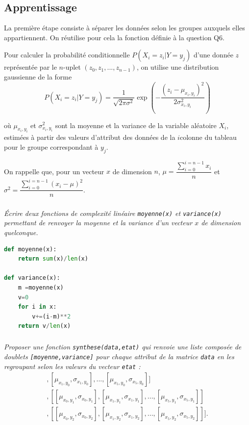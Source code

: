 \subsection*{Apprentissage}

\ifprof
\else
La première étape consiste à séparer les données selon les groupes auxquels elles appartiennent. On
réutilise pour cela la fonction  définie à la question Q6.


Pour calculer la probabilité conditionnelle $P\left(X_i = z_i|Y = y_j\right)$ d’une donnée $z$ représentée par le $n$-uplet $\left(z_0, z_1, ..., z_{n-1}\right)$, on utilise une distribution gaussienne de la forme
$$P\left(X_i = z_i|Y = y_j\right) = \dfrac{1}{\sqrt{2\pi \sigma^2}}\exp\left(-\dfrac{\left( z_i-\mu_{x_i,y_i}\right)^2}{2\sigma^2_{x_i,y_i}} \right)$$

où $\mu_{x_i,y_i}$ et $\sigma^2_{x_i,y_i}$ sont la moyenne et la variance de la variable aléatoire $X_i$, estimées à partir des valeurs
d’attribut des données de la $i$\ieme colonne du tableau  pour le groupe correspondant à $y_j$.

On rappelle que, pour un vecteur $x$ de dimension $n$, $\mu=\dfrac{\sum\limits_{i=0}^{i=n-1}x_i}{n}$ et $\sigma^2=\dfrac{\sum\limits_{i=0}^{i=n-1}\left(x_i-\mu\right)^2}{n}$.

\fi

\subparagraph{}\textit{Écrire deux fonctions de complexité linéaire \texttt{moyenne(x)} et \texttt{variance(x)} permettant de renvoyer la moyenne et la variance d’un vecteur $x$ de dimension quelconque.}
\ifprof
\begin{corrige}
\begin{lstlisting}[language=Python]
def moyenne(x):
    return sum(x)/len(x)

def variance(x):
    m =moyenne(x)
    v=0
    for i in x:
        v+=(i-m)**2
    return v/len(x)
\end{lstlisting}
\end{corrige}
\else
\fi

\subparagraph{}\textit{Proposer une fonction \texttt{synthese(data,etat)} qui renvoie une liste composée de doublets \texttt{[moyenne,variance]} pour chaque attribut de la matrice \texttt{data} en les regroupant selon les valeurs du vecteur \texttt{etat} :}
\begin{align*}
[[[\mu_{x_0,y_0}, \sigma_{x_0,y_0} ], [\mu_{x_1,y_0}, \sigma_{x_1,y_0} ], . . . , [\mu_{x_5,y_0}, \sigma_{x_5,y_0} ]]\\,
[[\mu_{x_0,y_1}, \sigma_{x_0,y_1} ], [\mu_{x_1,y_1}, \sigma_{x_1,y_1} ], . . . , [\mu_{x_5,y_1}, \sigma_{x_5,y_1} ]]\\,
[[\mu_{x_0,y_2}, \sigma_{x_0,y_2} ], [\mu_{x_1,y_2}, \sigma_{x_1,y_2} ], . . . , [\mu_{x_5,y_2}, \sigma_{x_5,y_2} ]]].
\end{align*}

